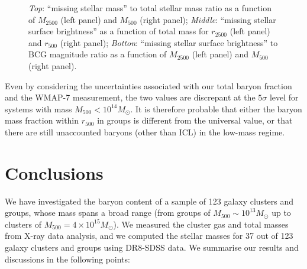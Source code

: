 \documentclass{aa}
\begin{document}
\begin{figure}[ht]
\caption{\textit{Top}: ``missing stellar mass'' to total stellar mass ratio as a function of $M_{2500}$ (left panel) and $M_{500}$ (right panel);
   \textit{Middle}: ``missing stellar surface brightness'' as a function of total mass for $r_{2500}$ (left panel) and $r_{500}$ (right panel);
   \textit{Botton}: ``missing stellar surface brightness'' to BCG magnitude ratio as a
  function of $M_{2500}$ (left panel) and $M_{500}$ (right panel).}
\label{fig:missmass}
\end{figure}


Even by considering the uncertainties associated with our total baryon
fraction and the WMAP-7 measurement, the two values are
discrepant at the  $5\sigma$ level for systems with mass $M_{500} <
10^{14}M_{\odot}$. It is therefore probable that either
 the baryon mass fraction within $r_{500}$
in groups is different from the universal value, or that there are still
unaccounted baryons (other than ICL) in the low-mass regime.


\section{Conclusions}
\label{conc}


We have investigated the baryon content of a sample of 123 galaxy
clusters and groups, whose mass spans a broad range (from groups of
$M_{500} \sim 10^{13} M_{\odot}$ up to clusters of $M_{500} = 4 \times
10^{15} M_{\odot}$). We measured the cluster gas and total
masses from X-ray data analysis, and we computed the stellar masses for
37 out of 123 galaxy clusters and groups using DR8-SDSS data. 
We summarise our results and
discussions in the following points:
\end{document}
